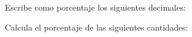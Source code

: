 \documentclass[12pt,addpoints]{evalua}
\begin{document}
\begin{questions}

    \question[6] Escribe como porcentaje los siguientes decimales:

    \begin{multicols}{3}
    \end{multicols}


    \question[10] Calcula el porcentaje de las siguientes cantidades:

    \begin{multicols}{3}
    \begin{parts}

\end{parts}
\end{multicols}
\end{questions}
\end{document}

